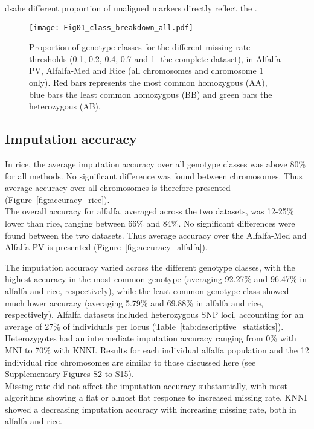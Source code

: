 dsahe different proportion of unaligned markers directly reflect the .

\begin{figure}
\texttt{[image: Fig01\_class\_breakdown\_all.pdf]}
\caption[Proportions of genotype classes]{​Proportion of genotype classes for the different missing rate thresholds (0.1, 0.2, 0.4, 0.7 and 1 -the complete dataset), in Alfalfa-PV, Alfalfa-Med and Rice (all chromosomes and chromosome 1 only). Red bars represents the most common homozygous (AA), blue bars the least common homozygous (BB) and green bars the heterozygous (AB).}
\label{fig:genotype_classes}
\end{figure}

\subsection{Imputation accuracy}
\label{sec:imputation_accuracy}  

In rice, the average imputation accuracy over all genotype classes was above 80\% for all methods. No significant difference was found between chromosomes. Thus average accuracy over all chromosomes is therefore presented (Figure~\ref{fig:accuracy_rice}). \\
The overall accuracy for alfalfa, averaged across the two datasets, was 12-25\% lower than rice, ranging between 66\% and 84\%. No significant differences were found between the two datasets. Thus average accuracy over the Alfalfa-Med and Alfalfa-PV is presented (Figure~\ref{fig:accuracy_alfalfa}).

The imputation accuracy varied across the different genotype classes, with the highest accuracy in the most common genotype (averaging 92.27\% and 96.47\% in alfalfa and rice, respectively), while the least common genotype class showed much lower accuracy (averaging 5.79\% and 69.88\% in alfalfa and rice, respectively).
Alfalfa datasets included heterozygous SNP loci, accounting for an average of 27\% of individuals per locus (Table~\ref{tab:descriptive_statistics}). Heterozygotes had an intermediate imputation accuracy ranging from 0\% with MNI to 70\% with KNNI. Results for each individual alfalfa population and the 12 individual rice chromosomes are similar to those discussed here (see Supplementary Figures S2 to S15). \\
Missing rate did not affect the imputation accuracy substantially, with most algorithms showing a flat or almost flat response to increased missing rate. KNNI showed a decreasing imputation accuracy with increasing missing rate, both in alfalfa and rice.

